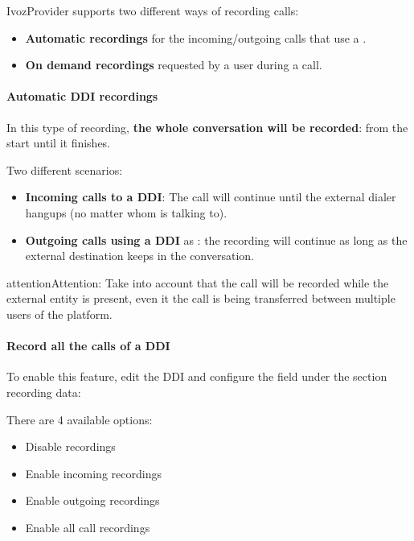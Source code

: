 \documentclass[letterpaper,10pt,english]{sphinxmanual}
\begin{document}
IvozProvider supports two different ways of recording calls:
\begin{itemize}
\item {} 
\textbf{Automatic recordings} for the incoming/outgoing calls that use a
{\hyperref[administration_portal/brand/views/ddis:ddis]{}}.

\item {} 
\textbf{On demand recordings} requested by a user during a call.

\end{itemize}


\paragraph{Automatic DDI recordings}
\label{administration_portal/client/retail/calls/call_recordings:automatic-ddi-recordings}
In this type of recording, \textbf{the whole conversation will be recorded}: from
the start until it finishes.

Two different scenarios:
\begin{itemize}
\item {} 
\textbf{Incoming calls to a DDI}: The call will continue until the external
dialer hangups (no matter whom is talking to).

\item {} 
\textbf{Outgoing calls using a DDI} as {\hyperref[administration_portal/brand/views/ddis:ddis]{}}: the
recording will continue as long as the external destination keeps in the
conversation.

\end{itemize}

\begin{notice}{attention}{Attention:}
Take into account that the call will be recorded while the
external entity is present, even it the call is being transferred between
multiple users of the platform.
\end{notice}
\paragraph{Record all the calls of a DDI}

To enable this feature, edit the DDI and configure the field under the section
recording data:

There are 4 available options:
\begin{itemize}
\item {} 
Disable recordings

\item {} 
Enable incoming recordings

\item {} 
Enable outgoing recordings

\item {} 
Enable all call recordings

\end{itemize}
\end{document}
